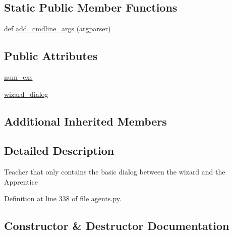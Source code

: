 \subsection*{Static Public Member Functions}
\begin{DoxyCompactItemize}
\item 
def \hyperlink{classparlai_1_1tasks_1_1wizard__of__wikipedia_1_1agents_1_1BasicdialogTeacher_a05990443efe8ab6f6361cbea39d50dca}{add\+\_\+cmdline\+\_\+args} (argparser)
\end{DoxyCompactItemize}
\subsection*{Public Attributes}
\begin{DoxyCompactItemize}
\item 
\hyperlink{classparlai_1_1tasks_1_1wizard__of__wikipedia_1_1agents_1_1BasicdialogTeacher_ab4f662982ef3d074d3d813f53d300ca4}{num\+\_\+exs}
\item 
\hyperlink{classparlai_1_1tasks_1_1wizard__of__wikipedia_1_1agents_1_1BasicdialogTeacher_a696c74de1866ac0f243d59c603ecaae9}{wizard\+\_\+dialog}
\end{DoxyCompactItemize}
\subsection*{Additional Inherited Members}


\subsection{Detailed Description}
\begin{DoxyVerb}Teacher that only contains the basic dialog between the wizard and
the Apprentice
\end{DoxyVerb}
 

Definition at line 338 of file agents.\+py.



\subsection{Constructor \& Destructor Documentation}
\mbox{\label{classparlai_1_1tasks_1_1wizard__of__wikipedia_1_1agents_1_1BasicdialogTeacher_a15a3b192484500d616eeac7bcd871cc2}} 
